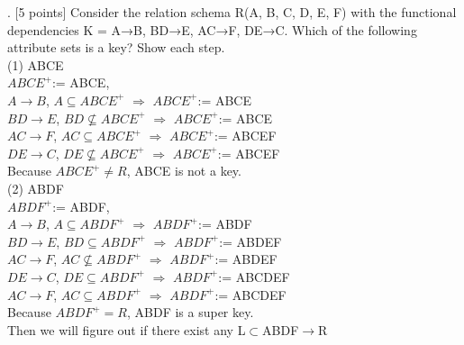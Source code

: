 \documentclass[]{article}
\begin{document}
	. [5 points] Consider the relation schema R(A, B, C, D, E, F) with the functional dependencies K = {A→B, BD→E, AC→F, DE→C}. Which of the following attribute sets is a key? Show each step.  \\
	
	(1) ABCE  \\
	
	$ABCE^{+}$:= ABCE,   \\
	
	$A\rightarrow B$, $A\subseteq ABCE^{+}$ $\Longrightarrow$ $ABCE^{+}$:= ABCE \\
	
	$BD\rightarrow E$, $BD\not\subseteq ABCE^{+}$ $\Longrightarrow$ $ABCE^{+}$:= ABCE \\
	
	$AC\rightarrow F$, $AC\subseteq ABCE^{+}$  $\Longrightarrow$ $ABCE^{+}$:= ABCEF \\
	
	$DE\rightarrow C$, $DE\not\subseteq ABCE^{+}$  $\Longrightarrow$ $ABCE^{+}$:= ABCEF \\
	
	Because $ABCE^{+}\ne R$, ABCE is not a key.  \\
	
	(2) ABDF   \\
	
	$ABDF^{+}$:= ABDF,   \\
	
	$A\rightarrow B$, $A\subseteq ABDF^{+}$ $\Longrightarrow$ $ABDF^{+}$:= ABDF \\
	
	$BD\rightarrow E$, $BD\subseteq ABDF^{+}$ $\Longrightarrow$ $ABDF^{+}$:= ABDEF \\
	
	$AC\rightarrow F$, $AC\not\subseteq ABDF^{+}$  $\Longrightarrow$ $ABDF^{+}$:= ABDEF \\
	
	$DE\rightarrow C$, $DE\subseteq ABDF^{+}$  $\Longrightarrow$ $ABDF^{+}$:= ABCDEF \\
	
	$AC\rightarrow F$, $AC\subseteq ABDF^{+}$  $\Longrightarrow$ $ABDF^{+}$:= ABCDEF \\
	
	Because $ABDF^{+} = R$, ABDF is a super key.  \\
	
	Then we will figure out if there exist any L$\subset$ABDF$\rightarrow$R  \\
	
\end{document}
